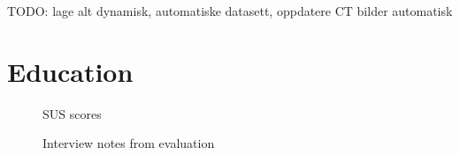 \documentclass[a4paper]{report}
\begin{document}
TODO: lage alt dynamisk, automatiske datasett, oppdatere CT bilder automatisk

\section{Education}


\appendix


\begin{figure}[h!]
    \centering
	\hfill
	\caption{SUS scores}\label{sus}
  \small
\end{figure}

\begin{figure}[h!]
    \centering
	\hfill
	\caption{Interview notes from evaluation}\label{implants}
  \small
\end{figure}
\end{document}
